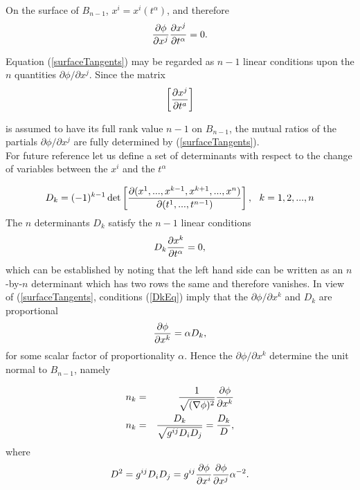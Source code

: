 On the surface of $B_{n-1}$, $x^i = x^i(t^\alpha)$, and therefore
\begin{equation} {\partial \phi\over \partial x^j}{\partial x^j\over \partial t^\alpha} = 0. \label{surfaceTangents} \end{equation}

Equation (\ref{surfaceTangents}) may be regarded as $n-1$  linear conditions upon the $n$ quantities ${\partial \phi / \partial x^j}$. Since the matrix 
$$\left[
{\partial x^j \over \partial t^a} 
\right]$$

is assumed to have its full rank value $n-1$ on $B_{n-1}$, the mutual  ratios of the partials $\partial \phi / \partial x^j$ are fully determined by
(\ref{surfaceTangents}).\\

For future reference let us define a set of determinants with respect to the change of variables between the $x^i$ and the $t^\alpha$

\begin{equation}
 D_k = (-1)^{k-1} \det\left[ {\partial(x^1, ..., x^{k-1},x^{k+1},...,x^n)\over \partial (t^1, ..., t^{n-1})} \right], ~~k = 1,2,...,n \label{dsubk}
 \end{equation}
The $n$ determinants $D_k$ satisfy the $n-1$ linear conditions 
\begin{equation} D_k {\partial x^k\over \partial t^\alpha} = 0,\label{DkEq} \end{equation}
which can be established by noting that the left hand side can be written as an $n$-by-$n$ determinant which has two rows the same and therefore vanishes.
In view of (\ref{surfaceTangents}, conditions (\ref{DkEq}) imply that the $\partial \phi / \partial x^k$ and $D_k$ are proportional
\[ {\partial \phi\over \partial x^k} =  \alpha D_k,\] for some scalar factor of proportionality $\alpha$. Hence the $\partial \phi/ \partial x^k$ determine the unit 
normal to $B_{n-1}$, namely

\begin{eqnarray}
n_k &=& {1\over \sqrt{(\nabla \phi)^2}} {\partial \phi\over \partial x^k}\\
n_k &=& {D_k\over\sqrt{g^{ij} D_iD_j}} = {D_k\over D},\label{normB}
\end{eqnarray}
where \[ D^2 = g^{ij} D_iD_j = g^{ij} {\partial \phi\over \partial x^i} {\partial \phi\over \partial x^j } \alpha^{-2}.\]

